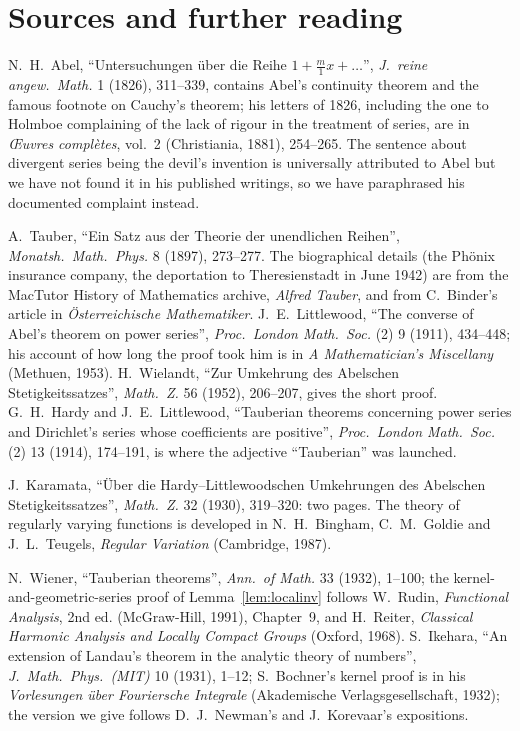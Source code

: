 \section*{Sources and further reading}

N.~H.~Abel, ``Untersuchungen \"uber die Reihe $1+\frac m1x+\dots$'', \emph{J.\ reine angew.\ Math.} 1 (1826), 311--339, contains Abel's continuity theorem
and the famous footnote on Cauchy's theorem; his letters of 1826, including the one to Holmboe complaining of the lack of rigour in the treatment of
series, are in \emph{\OE uvres compl\`etes}, vol.~2 (Christiania, 1881), 254--265. The sentence about divergent series being the devil's invention is
universally attributed to Abel but we have not found it in his published writings, so we have paraphrased his documented complaint instead.

A.~Tauber, ``Ein Satz aus der Theorie der unendlichen Reihen'', \emph{Monatsh.\ Math.\ Phys.} 8 (1897), 273--277. The biographical details (the Ph\"onix
insurance company, the deportation to Theresienstadt in June 1942) are from the MacTutor History of Mathematics archive, \emph{Alfred Tauber}, and from
C.~Binder's article in \emph{\"Osterreichische Mathematiker}. J.~E.~Littlewood, ``The converse of Abel's theorem on power series'', \emph{Proc.\ London
Math.\ Soc.} (2) 9 (1911), 434--448; his account of how long the proof took him is in \emph{A Mathematician's Miscellany} (Methuen, 1953). H.~Wielandt, ``Zur Umkehrung des Abelschen Stetigkeitssatzes'', \emph{Math.\ Z.} 56 (1952), 206--207, gives the short proof. G.~H.~Hardy and
J.~E.~Littlewood, ``Tauberian theorems concerning power series and Dirichlet's series whose coefficients are positive'', \emph{Proc.\ London Math.\ Soc.}
(2) 13 (1914), 174--191, is where the adjective ``Tauberian'' was launched.

J.~Karamata, ``\"Uber die Hardy--Little\-wood\-schen Um\-keh\-rungen des Abel\-schen Stetig\-keits\-satzes'', \emph{Math.\ Z.} 32 (1930), 319--320: two pages. The theory
of regularly varying functions is developed in N.~H.~Bingham, C.~M.~Goldie and J.~L.~Teugels, \emph{Regular Variation} (Cambridge, 1987).

N.~Wiener, ``Tauberian theorems'', \emph{Ann.\ of Math.} 33 (1932), 1--100; the kernel-and-geometric-series proof of Lemma~\ref{lem:localinv} follows
W.~Rudin, \emph{Functional Analysis}, 2nd ed. (McGraw-Hill, 1991), Chapter~9, and H.~Reiter, \emph{Classical Harmonic Analysis and Locally Compact Groups}
(Oxford, 1968). S.~Ikehara, ``An extension of Landau's theorem in the analytic theory of numbers'', \emph{J.\ Math.\ Phys.\ (MIT)} 10 (1931), 1--12;
S.~Bochner's kernel proof is in his \emph{Vorlesungen \"uber Fouriersche Integrale} (Akademische Verlagsgesellschaft, 1932); the version we give follows
D.~J.~Newman's and J.~Korevaar's expositions.

